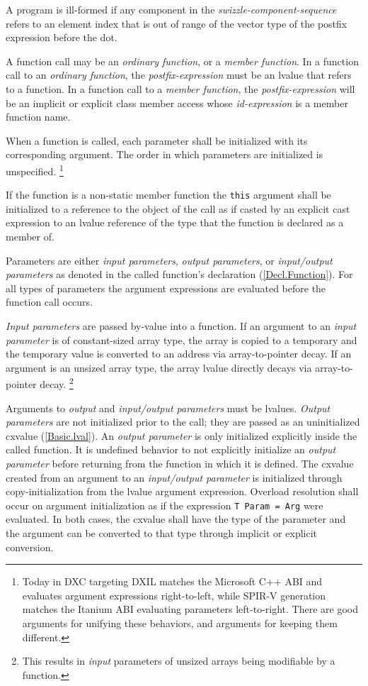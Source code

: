 \p A program is ill-formed if any component in the \textit{swizzle-component-sequence}
refers to an element index that is out of range of the vector type of the
postfix expression before the dot.


\p A function call may be an \textit{ordinary function}, or a \textit{member
function}. In a function call to an \textit{ordinary function}, the
\textit{postfix-expression} must be an lvalue that refers to a function. In a
function call to a \textit{member function}, the \textit{postfix-expression}
will be an implicit or explicit class member access whose \textit{id-expression}
is a member function name.

\p When a function is called, each parameter shall be initialized with its
corresponding argument. The order in which parameters are initialized is
unspecified. \footnote{Today in DXC targeting DXIL matches the Microsoft C++ ABI
and evaluates argument expressions right-to-left, while SPIR-V generation
matches the Itanium ABI evaluating parameters left-to-right. There are good
arguments for unifying these behaviors, and arguments for keeping them
different.}

\p If the function is a non-static member function the \texttt{this} argument
shall be initialized to a reference to the object of the call as if casted by an
explicit cast expression to an lvalue reference of the type that the function is
declared as a member of.

\p Parameters are either \textit{input parameters}, \textit{output parameters},
or \textit{input/output parameters} as denoted in the called function's
declaration (\ref{Decl.Function}). For all types of parameters the argument
expressions are evaluated before the function call occurs.

\p \textit{Input parameters} are passed by-value into a function. If an argument
to an \textit{input parameter} is of constant-sized array type, the array is
copied to a temporary and the temporary value is converted to an address via
array-to-pointer decay. If an argument is an unsized array type, the array
lvalue directly decays via array-to-pointer decay. \footnote{This results in
\textit{input} parameters of unsized arrays being modifiable by a function.}

\p Arguments to \textit{output} and \textit{input/output parameters} must be
lvalues. \textit{Output parameters} are not initialized prior to the call; they
are passed as an uninitialized cxvalue (\ref{Basic.lval}). An \textit{output
parameter} is only initialized explicitly inside the called function. It is
undefined behavior to not explicitly initialize an \textit{output parameter}
before returning from the function in which it is defined. The cxvalue created
from an argument to an \textit{input/output parameter} is initialized through
copy-initialization from the lvalue argument expression. Overload resolution
shall occur on argument initialization as if the expression \texttt{T Param =
Arg} were evaluated. In both cases, the cxvalue shall have the type of the
parameter and the argument can be converted to that type through implicit or
explicit conversion.


